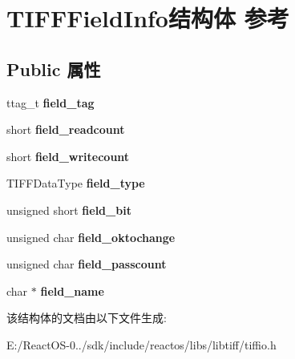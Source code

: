 \hypertarget{struct_t_i_f_f_field_info}{}\section{T\+I\+F\+F\+Field\+Info结构体 参考}
\label{struct_t_i_f_f_field_info}
\subsection*{Public 属性}
\begin{DoxyCompactItemize}
\item 
\mbox{\label{struct_t_i_f_f_field_info_a6eeb73c0bdb1f5df1a9c869848e9b339}} 
ttag\+\_\+t {\bfseries field\+\_\+tag}
\item 
\mbox{\label{struct_t_i_f_f_field_info_a5c0c4c69fd4b9cb6760c93bd2fa057a3}} 
short {\bfseries field\+\_\+readcount}
\item 
\mbox{\label{struct_t_i_f_f_field_info_ae6ad86c14c3db2a5afd9571b47531307}} 
short {\bfseries field\+\_\+writecount}
\item 
\mbox{\label{struct_t_i_f_f_field_info_a91aba9220e3db23d0654e2f0fd35bc41}} 
T\+I\+F\+F\+Data\+Type {\bfseries field\+\_\+type}
\item 
\mbox{\label{struct_t_i_f_f_field_info_a967ecfdbac32224d5142b727b0ed50af}} 
unsigned short {\bfseries field\+\_\+bit}
\item 
\mbox{\label{struct_t_i_f_f_field_info_a5c4e1f027ab822f4c6b2883e89936c9d}} 
unsigned char {\bfseries field\+\_\+oktochange}
\item 
\mbox{\label{struct_t_i_f_f_field_info_a49374744eb9a1ee467b418b714cedd5e}} 
unsigned char {\bfseries field\+\_\+passcount}
\item 
\mbox{\label{struct_t_i_f_f_field_info_a922b31afb7e7afbdb05487dd1ba5de32}} 
char $\ast$ {\bfseries field\+\_\+name}
\end{DoxyCompactItemize}


该结构体的文档由以下文件生成\+:\begin{DoxyCompactItemize}
\item 
E\+:/\+React\+O\+S-\/0../sdk/include/reactos/libs/libtiff/tiffio.\+h\end{DoxyCompactItemize}
